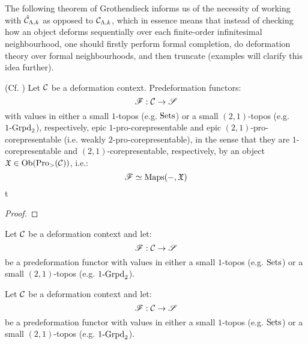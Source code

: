         The following theorem of Grothendieck informs us of the necessity of working with $\hat{\mathcal{C}}_{\Lambda, k}$ as opposed to $\mathcal{C}_{\Lambda, k}$, which in essence means that instead of checking how an object deforms sequentially over each finite-order infinitesimal neighbourhood, one should firstly perform formal completion, do deformation theory over formal neighbourhoods, and then truncate (examples will clarify this idea further). 
        \begin{theorem}  \label{theorem: predeformation_functors_are_pro_corepresentable}
            (Cf. \cite[Proposition 3.1]{grothendieck_fga_2}) Let $\mathcal{C}$ be a deformation context. Predeformation functors:
                $$\mathscr{F}: \mathcal{C} \to \mathscr{S}$$
            with values in either a small $1$-topos (e.g. $\mathrm{Sets}$) or a small $(2, 1)$-topos (e.g. $1\text{-}\mathrm{Grpd}_2$), respectively, epic $1$-pro-corepresentable and epic $(2, 1)$-pro-corepresentable (i.e. weakly $2$-pro-corepresentable), in the sense that they are $1$-corepresentable and $(2, 1)$-corepresentable, respectively, by an object $\mathfrak{X} \in \mathrm{Ob}(\mathrm{Pro}_{>}(\mathcal{C}))$, i.e.:
                $$\mathscr{F} \simeq \operatorname{Maps}(-, \mathfrak{X})$$t
        \end{theorem}
            \begin{proof}
                
            \end{proof}
        \begin{corollary}
            Let $\mathcal{C}$ be a deformation context and let:
                $$\mathscr{F}: \mathcal{C} \to \mathscr{S}$$
            be a predeformation functor with values in either a small $1$-topos (e.g. $\mathrm{Sets}$) or a small $(2, 1)$-topos (e.g. $1\text{-}\mathrm{Grpd}_2$). 
        \end{corollary}
        \begin{convention}
            Let $\mathcal{C}$ be a deformation context and let:
                $$\mathscr{F}: \mathcal{C} \to \mathscr{S}$$
            be a predeformation functor with values in either a small $1$-topos (e.g. $\mathrm{Sets}$) or a small $(2, 1)$-topos (e.g. $1\text{-}\mathrm{Grpd}_2$). 
        \end{convention}

